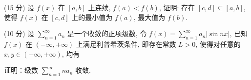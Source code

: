 (15 分) 设 $f(x)$ 在 $[a, b]$ 上连续, $f(a) < f(b)$, 证明: 存在 $[c, d] \subseteq [a, b]$, 使得 $f(x)$ 在 $[c, d]$ 上的最小值为 $f(a)$, 最大值为 $f(b)$.\par
\par{}
(10 分) 设 $\sum_{n=1}^{\infty} a_n$ 是一个收敛的正项级数, 令 $f(x) = \sum_{n=1}^{\infty} a_n |\sin nx|$, 已知 $f(x)$ 在 $(- \infty, +\infty)$ 上满足利普希茨条件, 即存在常数 $L > 0$, 使得对任意的 $x, y \in (-\infty, +\infty)$, 均有\par
\nopagebreak[4]
证明：级数 $\sum_{n=1}^{\infty} na_n$ 收敛.\par
